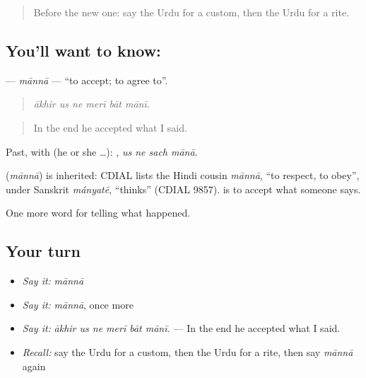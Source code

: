 \label{lesson:UR-C323-manna}



\begin{quote}
Before the new one: say the Urdu for a custom, then the Urdu for a rite.
\end{quote}

\subsection*{You'll want to know: }
\textbf{} — \emph{mānnā} — \textquotedblleft{}to accept; to agree to\textquotedblright{}.

\begin{quote}
     
\end{quote}

\begin{quote}
\emph{ākhir us ne merī bāt mānī.}
\end{quote}

\begin{quote}
In the end he accepted what I said.
\end{quote}

Past, with  (he or she …):    , \emph{us ne sach mānā}.

\begin{cousinweb}
\textbf{} (\emph{mānnā}) is inherited: CDIAL lists the Hindi cousin \emph{mānnā}, \textquotedblleft{}to respect, to obey\textquotedblright{}, under Sanskrit \emph{mányatē}, \textquotedblleft{}thinks\textquotedblright{} (CDIAL 9857). \textbf{ } is to accept what someone says.
\end{cousinweb}

\begin{grammarlens}[title={What you've built}]
One more word for telling what happened.
\end{grammarlens}

\subsection*{Your turn}
\begin{itemize}
\raggedright
  \item \emph{Say it:} \emph{mānnā}
  \item \emph{Say it:} \emph{mānnā}, once more
  \item \emph{Say it:} \emph{ākhir us ne merī bāt mānī.} — In the end he accepted what I said.
  \item \emph{Recall:} say the Urdu for a custom, then the Urdu for a rite, then say \emph{mānnā} again
\end{itemize}

